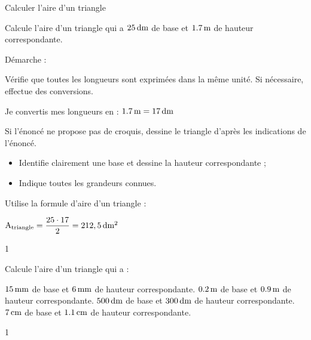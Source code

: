 \documentclass[a4paper,11pt]{report}
\let\oldcenter\center
\let\oldendcenter\endcenter
\renewenvironment{center}{\setlength\topsep{-10pt}\oldcenter}{\oldendcenter}
\begin{document}
\begin{resolu}{Calculer l'aire d'un triangle}{
		Calcule l'aire d'un triangle qui a $\tunit{25}{dm}$ de base et $\tunit{1,7}{m}$ de hauteur correspondante.

Démarche :
\vspace{-0.2cm}
\begin{tasks}[after-item-skip = 0.3em]
    \task Vérifie que toutes les longueurs sont exprimées dans la même unité. Si nécessaire, effectue des conversions.
    
{\color{blue} Je convertis mes longueurs en  : $\tunit{1,7}{m}=\tunit{17}{dm}$}
    
    \task Si l'énoncé ne propose pas de croquis, dessine le triangle d'après les indications de l'énoncé.
    \begin{itemize}
        \item Identifie clairement une base et dessine la hauteur correspondante ;
        \item Indique toutes les grandeurs connues.
    \end{itemize}
    \begin{center}
    \end{center}
\vspace{-0.8cm}
    \task Utilise la formule d'aire d'un triangle : 
      
    {\color{blue} $\textrm{A}_{\textrm{triangle}}=\dfrac{25\cdot17}{2}=212,\tunit{5}{dm^2}$
	    \vspace{-0.2cm}
    }
\end{tasks}

}{1}    
\end{resolu}


\begin{exo}{    %
Calcule l'aire d'un triangle qui a :
\vspace{-0.2cm}
\begin{tasks}[after-item-skip = 0.3em]
	\task $\tunit{15}{mm}$ de base et $\tunit{6}{mm}$ de hauteur correspondante.
	\task $\tunit{0,2}{m}$ de base et $\tunit{0,9}{m}$ de hauteur correspondante.
	\task $\tunit{500}{dm}$ de base et $\tunit{300}{dm}$ de hauteur correspondante.
	\task $\tunit{7}{cm}$ de base et $\tunit{1,1}{cm}$ de hauteur correspondante.
\end{tasks}
\vspace{-0.3cm}
}{1}
\end{exo}
\end{document}
